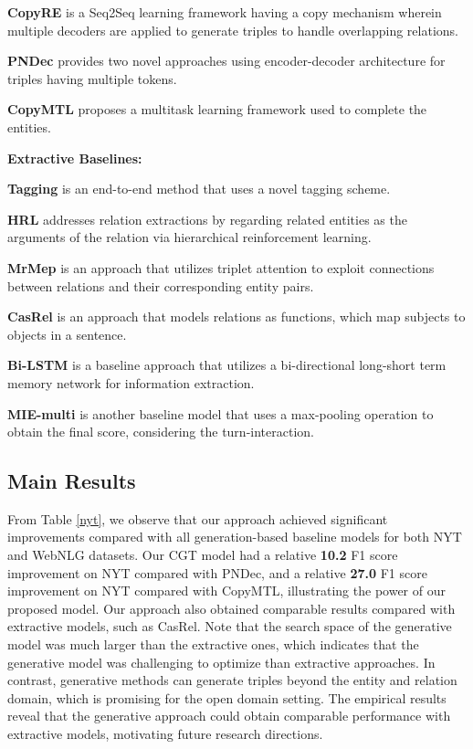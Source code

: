 \documentclass[letterpaper]{article} \usepackage{aaai21}  \usepackage{times}  \usepackage{helvet} \usepackage{courier}  \usepackage[hyphens]{url}  \usepackage{graphicx} \urlstyle{rm} \def\UrlFont{\rm}  \usepackage{natbib}  \usepackage[noend]{algpseudocode}
\begin{document}
\textbf{CopyRE} \cite{zeng2018extracting} is a Seq2Seq learning framework having a copy mechanism wherein multiple decoders are applied to generate triples to handle overlapping relations.

\textbf{PNDec} \cite{nayak2019effective} provides two novel approaches using encoder-decoder architecture for triples having multiple tokens.

\textbf{CopyMTL} \cite{zeng2020copymtl} proposes a multitask learning framework used to complete the entities. 
 
\textbf{Extractive Baselines:}

\textbf{Tagging} \cite{zheng2017joint} is an end-to-end method that uses a novel tagging scheme. 

\textbf{HRL} \cite{takanobu2019hierarchical} addresses relation extractions by regarding related entities as the arguments of the relation via hierarchical reinforcement learning. 

\textbf{MrMep} \cite{chen2019mrmep} is an approach that utilizes triplet attention to exploit connections between relations and their corresponding entity pairs.

\textbf{CasRel} \cite{wei2019joint} is an approach that models relations as functions, which map subjects to objects in a sentence.

\textbf{Bi-LSTM} \cite{zhang2020mie} is a baseline approach that utilizes a bi-directional long-short term memory network for information extraction. 

\textbf{MIE-multi} \cite{zhang2020mie} is another baseline model that uses a max-pooling operation to obtain the final score, considering the turn-interaction. 

\subsection{Main Results}

From Table \ref{nyt}, we observe that our approach achieved significant improvements compared with all generation-based baseline models for both NYT and WebNLG datasets. Our CGT model had a relative \textbf{10.2} F1 score improvement on NYT compared with PNDec, and a relative \textbf{27.0} F1 score improvement on NYT compared with CopyMTL, illustrating the power of our proposed model. Our approach also obtained comparable results compared with extractive models, such as CasRel. Note that the search space of the generative model was much larger than the extractive ones, which indicates that the generative model was challenging to optimize than extractive approaches. In contrast, generative methods can generate triples beyond the entity and relation domain, which is promising for the open domain setting. The empirical results reveal that the generative approach could obtain comparable performance with extractive models, motivating future research directions. 
\end{document}
